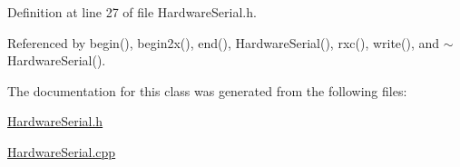 Definition at line 27 of file HardwareSerial.h.



Referenced by begin(), begin2x(), end(), HardwareSerial(), rxc(), write(), and $\sim$HardwareSerial().



The documentation for this class was generated from the following files:\begin{DoxyCompactItemize}
\item 
\hyperlink{_hardware_serial_8h}{HardwareSerial.h}\item 
\hyperlink{_hardware_serial_8cpp}{HardwareSerial.cpp}\end{DoxyCompactItemize}
